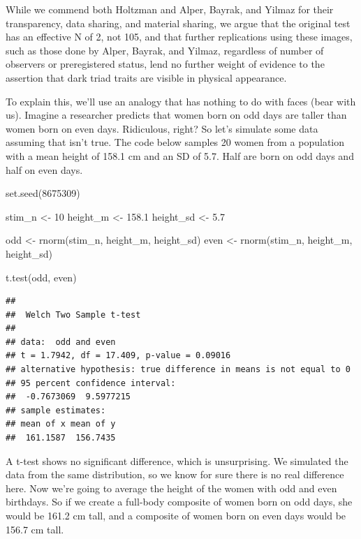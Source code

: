 \documentclass[
  man,floatsintext]{apa6}
\newenvironment{Shaded}{\begin{snugshade}}{\end{snugshade}}
\newcommand{\DecValTok}[1]{\textcolor[rgb]{0.00,0.00,0.81}{#1}}
\newcommand{\FloatTok}[1]{\textcolor[rgb]{0.00,0.00,0.81}{#1}}
\newcommand{\FunctionTok}[1]{\textcolor[rgb]{0.00,0.00,0.00}{#1}}
\newcommand{\NormalTok}[1]{#1}
\newcommand{\OtherTok}[1]{\textcolor[rgb]{0.56,0.35,0.01}{#1}}
\begin{document}
While we commend both Holtzman and Alper, Bayrak, and Yilmaz for their transparency, data sharing, and material sharing, we argue that the original test has an effective N of 2, not 105, and that further replications using these images, such as those done by Alper, Bayrak, and Yilmaz, regardless of number of observers or preregistered status, lend no further weight of evidence to the assertion that dark triad traits are visible in physical appearance.

To explain this, we'll use an analogy that has nothing to do with faces (bear with us). Imagine a researcher predicts that women born on odd days are taller than women born on even days. Ridiculous, right? So let's simulate some data assuming that isn't true. The code below samples 20 women from a population with a mean height of 158.1 cm and an SD of 5.7. Half are born on odd days and half on even days.

\begin{Shaded}
\begin{Highlighting}[]
\FunctionTok{set.seed}\NormalTok{(}\DecValTok{8675309}\NormalTok{)}

\NormalTok{stim\_n }\OtherTok{\textless{}{-}} \DecValTok{10}
\NormalTok{height\_m }\OtherTok{\textless{}{-}} \FloatTok{158.1}
\NormalTok{height\_sd }\OtherTok{\textless{}{-}} \FloatTok{5.7}

\NormalTok{odd }\OtherTok{\textless{}{-}} \FunctionTok{rnorm}\NormalTok{(stim\_n, height\_m, height\_sd)}
\NormalTok{even }\OtherTok{\textless{}{-}} \FunctionTok{rnorm}\NormalTok{(stim\_n, height\_m, height\_sd)}

\FunctionTok{t.test}\NormalTok{(odd, even)}
\end{Highlighting}
\end{Shaded}

\begin{verbatim}
## 
##  Welch Two Sample t-test
## 
## data:  odd and even
## t = 1.7942, df = 17.409, p-value = 0.09016
## alternative hypothesis: true difference in means is not equal to 0
## 95 percent confidence interval:
##  -0.7673069  9.5977215
## sample estimates:
## mean of x mean of y 
##  161.1587  156.7435
\end{verbatim}

A t-test shows no significant difference, which is unsurprising. We simulated the data from the same distribution, so we know for sure there is no real difference here. Now we're going to average the height of the women with odd and even birthdays. So if we create a full-body composite of women born on odd days, she would be 161.2 cm tall, and a composite of women born on even days would be 156.7 cm tall.
\end{document}
